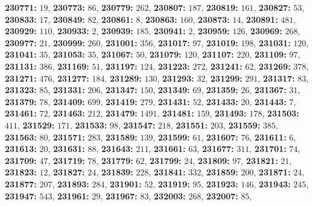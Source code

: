 \textsf{\bfseries 230771:} $19$, \textsf{\bfseries 230773:} $86$, \textsf{\bfseries 230779:} $262$, \textsf{\bfseries 230807:} $187$, \textsf{\bfseries 230819:} $161$, \textsf{\bfseries 230827:} $53$, \textsf{\bfseries 230833:} $17$, \textsf{\bfseries 230849:} $82$, \textsf{\bfseries 230861:} $8$, \textsf{\bfseries 230863:} $160$, \textsf{\bfseries 230873:} $14$, \textsf{\bfseries 230891:} $481$, \textsf{\bfseries 230929:} $110$, \textsf{\bfseries 230933:} $2$, \textsf{\bfseries 230939:} $185$, \textsf{\bfseries 230941:} $2$, \textsf{\bfseries 230959:} $126$, \textsf{\bfseries 230969:} $268$, \textsf{\bfseries 230977:} $21$, \textsf{\bfseries 230999:} $260$, \textsf{\bfseries 231001:} $356$, \textsf{\bfseries 231017:} $97$, \textsf{\bfseries 231019:} $198$, \textsf{\bfseries 231031:} $120$, \textsf{\bfseries 231041:} $35$, \textsf{\bfseries 231053:} $35$, \textsf{\bfseries 231067:} $50$, \textsf{\bfseries 231079:} $120$, \textsf{\bfseries 231107:} $220$, \textsf{\bfseries 231109:} $97$, \textsf{\bfseries 231131:} $386$, \textsf{\bfseries 231169:} $51$, \textsf{\bfseries 231197:} $124$, \textsf{\bfseries 231223:} $272$, \textsf{\bfseries 231241:} $62$, \textsf{\bfseries 231269:} $378$, \textsf{\bfseries 231271:} $476$, \textsf{\bfseries 231277:} $184$, \textsf{\bfseries 231289:} $130$, \textsf{\bfseries 231293:} $32$, \textsf{\bfseries 231299:} $291$, \textsf{\bfseries 231317:} $83$, \textsf{\bfseries 231323:} $85$, \textsf{\bfseries 231331:} $206$, \textsf{\bfseries 231347:} $150$, \textsf{\bfseries 231349:} $69$, \textsf{\bfseries 231359:} $26$, \textsf{\bfseries 231367:} $31$, \textsf{\bfseries 231379:} $78$, \textsf{\bfseries 231409:} $699$, \textsf{\bfseries 231419:} $279$, \textsf{\bfseries 231431:} $52$, \textsf{\bfseries 231433:} $20$, \textsf{\bfseries 231443:} $7$, \textsf{\bfseries 231461:} $72$, \textsf{\bfseries 231463:} $212$, \textsf{\bfseries 231479:} $1491$, \textsf{\bfseries 231481:} $159$, \textsf{\bfseries 231493:} $178$, \textsf{\bfseries 231503:} $411$, \textsf{\bfseries 231529:} $171$, \textsf{\bfseries 231533:} $98$, \textsf{\bfseries 231547:} $218$, \textsf{\bfseries 231551:} $203$, \textsf{\bfseries 231559:} $385$, \textsf{\bfseries 231563:} $80$, \textsf{\bfseries 231571:} $283$, \textsf{\bfseries 231589:} $139$, \textsf{\bfseries 231599:} $61$, \textsf{\bfseries 231607:} $76$, \textsf{\bfseries 231611:} $6$, \textsf{\bfseries 231613:} $20$, \textsf{\bfseries 231631:} $88$, \textsf{\bfseries 231643:} $211$, \textsf{\bfseries 231661:} $63$, \textsf{\bfseries 231677:} $311$, \textsf{\bfseries 231701:} $74$, \textsf{\bfseries 231709:} $47$, \textsf{\bfseries 231719:} $78$, \textsf{\bfseries 231779:} $62$, \textsf{\bfseries 231799:} $24$, \textsf{\bfseries 231809:} $97$, \textsf{\bfseries 231821:} $21$, \textsf{\bfseries 231823:} $12$, \textsf{\bfseries 231827:} $24$, \textsf{\bfseries 231839:} $228$, \textsf{\bfseries 231841:} $332$, \textsf{\bfseries 231859:} $200$, \textsf{\bfseries 231871:} $24$, \textsf{\bfseries 231877:} $207$, \textsf{\bfseries 231893:} $284$, \textsf{\bfseries 231901:} $52$, \textsf{\bfseries 231919:} $95$, \textsf{\bfseries 231923:} $146$, \textsf{\bfseries 231943:} $245$, \textsf{\bfseries 231947:} $543$, \textsf{\bfseries 231961:} $29$, \textsf{\bfseries 231967:} $83$, \textsf{\bfseries 232003:} $268$, \textsf{\bfseries 232007:} $85$, 
